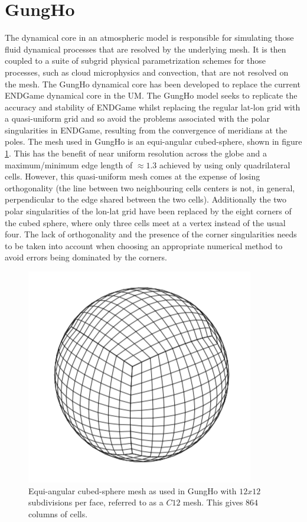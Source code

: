 \documentclass[review,times]{elsarticle}
\begin{document}
\section{\label{sec:GH}GungHo}

The dynamical core in an atmospheric model is responsible for
simulating those fluid dynamical processes that are resolved by the
underlying mesh. It is then coupled to a suite of subgrid physical
parametrization schemes for those processes, such as cloud
microphysics and convection, that are not resolved on the mesh.  The
GungHo dynamical core has been developed to replace the current ENDGame
dynamical core in the UM. The GungHo model seeks to replicate the
accuracy and stability of ENDGame whilst replacing the regular lat-lon
grid with a quasi-uniform grid and so avoid the problems associated
with the polar singularities in ENDGame, resulting from the
convergence of meridians at the poles. The mesh used in GungHo is an
equi-angular cubed-sphere, shown in figure \ref{fig:cubed-sphere}.
This has the benefit of near uniform resolution across the globe and a
maximum/minimum edge length of $\approx 1.3$ achieved by using only
quadrilateral cells.  However, this quasi-uniform mesh comes at the
expense of losing orthogonality (the line between two neighbouring
cells centers is not, in general, perpendicular to the edge shared
between the two cells). Additionally the two polar singularities of
the lon-lat grid have been replaced by the eight corners of
the cubed sphere, where only three cells meet at a vertex instead of
the usual four. The lack of orthogonality and the presence of the
corner singularities needs to be taken into account when choosing an
appropriate numerical method to avoid errors being dominated by the
corners.
%
\begin{figure}
\centering\includegraphics[width=0.6\linewidth]{Cubed-Sphere.png}
\caption{\label{fig:cubed-sphere} Equi-angular cubed-sphere mesh as
used in GungHo with $12x12$ subdivisions per face, 
referred to as a $C12$ mesh. This gives $864$ columns of cells. }
\end{figure}
%
\end{document}
